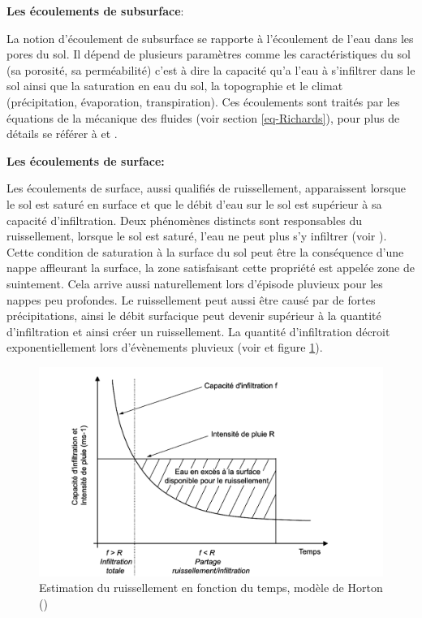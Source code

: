 \documentclass[a4paper,11pt]{article}
\numberwithin{equation}{section}
\begin{document}
\vspace{0.7cm}

\noindent\textbf{Les écoulements de subsurface}:

La notion d'écoulement de subsurface se rapporte à l'écoulement de l'eau dans les pores du sol. Il dépend de plusieurs paramètres comme les caractéristiques du sol (sa porosité, sa perméabilité) c'est à dire la capacité qu'a l'eau à s'infiltrer dans le sol ainsi que la saturation en eau du sol, la topographie et le climat (précipitation, évaporation, transpiration). Ces écoulements sont traités par les équations de la mécanique des fluides (voir section  \ref{eq-Richards}), pour plus de détails se référer à \cite{maquin2016developpement} et \cite{marsily_de1986quantitative}. 

\vspace{0.7cm}

\noindent\textbf{Les écoulements de surface:}

Les écoulements de surface, aussi qualifiés de ruissellement, apparaissent lorsque le sol est saturé en surface et que le débit d'eau sur le sol est supérieur à sa capacité d'infiltration. Deux phénomènes distincts sont responsables du ruissellement, lorsque le sol est saturé, l’eau ne peut plus s’y infiltrer (voir \cite{cappus1960etude}). Cette condition de saturation à la surface du sol peut être la conséquence d'une nappe affleurant la surface, la zone satisfaisant cette propriété est appelée zone de suintement. Cela arrive aussi naturellement lors d'épisode pluvieux pour les nappes peu profondes. Le ruissellement peut aussi être causé par de fortes précipitations, ainsi le débit surfacique peut devenir supérieur à la quantité d'infiltration et ainsi créer un ruissellement. La quantité d'infiltration décroit exponentiellement lors d'évènements pluvieux (voir \cite{horton1933role} et figure \ref{fig-Horton}).  

\begin{figure}[H]
	\centering\includegraphics[scale=0.2]{ruissellement.png}
	\caption{Estimation du ruissellement en fonction du temps, modèle de Horton (\cite{maquin2016developpement})}
	\label{fig-Horton}
\end{figure}
\end{document}
